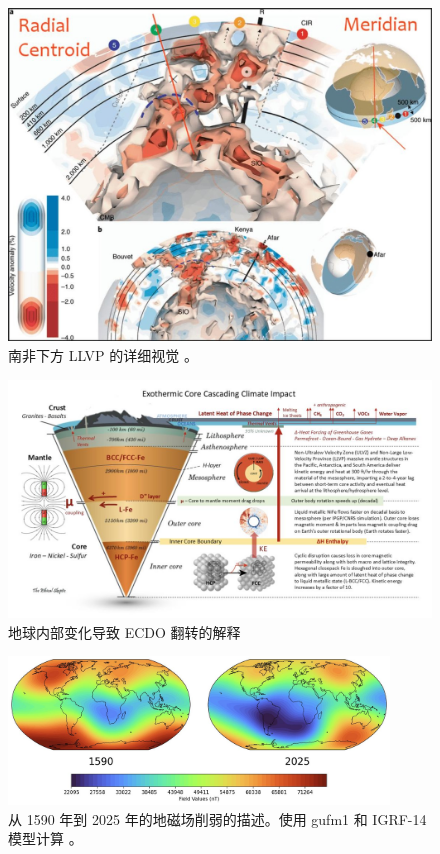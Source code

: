 \documentclass[10pt,twocolumn,letterpaper]{article}
\begin{document}
\begin{figure}[t]
\begin{center}
   \includegraphics[width=1\linewidth]{llvp.jpg}
\end{center}
   \caption{南非下方 LLVP 的详细视觉 \cite{28}。}
\label{fig:12}
\label{fig:onecol}
\end{figure}

\begin{figure}[t]
\begin{center}
\includegraphics[width=1\textwidth]{layers.jpg}
\end{center}
   \caption{地球内部变化导致 ECDO 翻转的解释 \cite{129}}
\label{fig:11}
\end{figure}

\begin{figure}[b]
\begin{center}
\includegraphics[width=0.9\textwidth]{saa.jpg}
\end{center}
   \caption{从 1590 年到 2025 年的地磁场削弱的描述。使用 gufm1 和 IGRF-14 模型计算 \cite{125,126}。}
\label{fig:14}
\end{figure}
\end{document}
